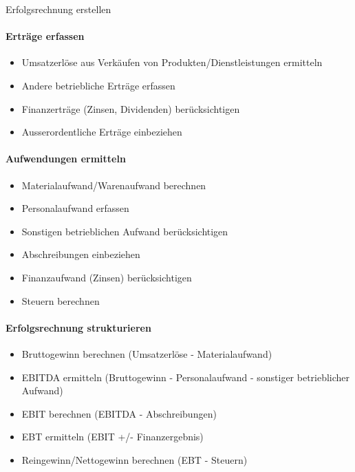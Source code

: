 \begin{KR}{Erfolgsrechnung erstellen}\\
\paragraph{Erträge erfassen}
\begin{itemize}
    \item Umsatzerlöse aus Verkäufen von Produkten/Dienstleistungen ermitteln
    \item Andere betriebliche Erträge erfassen
    \item Finanzerträge (Zinsen, Dividenden) berücksichtigen
    \item Ausserordentliche Erträge einbeziehen
\end{itemize}

\paragraph{Aufwendungen ermitteln}
\begin{itemize}
    \item Materialaufwand/Warenaufwand berechnen
    \item Personalaufwand erfassen
    \item Sonstigen betrieblichen Aufwand berücksichtigen
    \item Abschreibungen einbeziehen
    \item Finanzaufwand (Zinsen) berücksichtigen
    \item Steuern berechnen
\end{itemize}

\paragraph{Erfolgsrechnung strukturieren}
\begin{itemize}
    \item Bruttogewinn berechnen (Umsatzerlöse - Materialaufwand)
    \item EBITDA ermitteln (Bruttogewinn - Personalaufwand - sonstiger betrieblicher Aufwand)
    \item EBIT berechnen (EBITDA - Abschreibungen)
    \item EBT ermitteln (EBIT +/- Finanzergebnis)
    \item Reingewinn/Nettogewinn berechnen (EBT - Steuern)
\end{itemize}
\end{KR}

